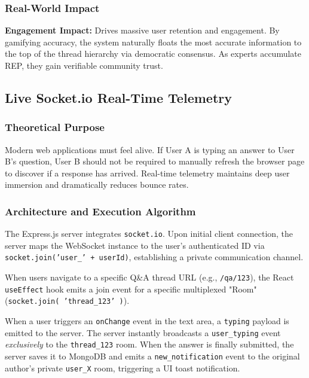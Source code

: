 \documentclass[12pt,a4paper]{article}
\begin{document}
\subsubsection{Real-World Impact}
\textbf{Engagement Impact:} Drives massive user retention and engagement. By gamifying accuracy, the system naturally floats the most accurate information to the top of the thread hierarchy via democratic consensus. As experts accumulate REP, they gain verifiable community trust.

\newpage

\subsection{Live Socket.io Real-Time Telemetry}

\subsubsection{Theoretical Purpose}
Modern web applications must feel alive. If User A is typing an answer to User B's question, User B should not be required to manually refresh the browser page to discover if a response has arrived. Real-time telemetry maintains deep user immersion and dramatically reduces bounce rates.

\subsubsection{Architecture and Execution Algorithm}
The Express.js server integrates \texttt{socket.io}. Upon initial client connection, the server maps the WebSocket instance to the user's authenticated ID via \texttt{socket.join('user\_' + userId)}, establishing a private communication channel.

When users navigate to a specific Q\&A thread URL (e.g., \texttt{/qa/123}), the React \texttt{useEffect} hook emits a join event for a specific multiplexed "Room" (\texttt{socket.join( 'thread\_123' )}). 

When a user triggers an \texttt{onChange} event in the text area, a \texttt{typing} payload is emitted to the server. The server instantly broadcasts a \texttt{user\_typing} event \textit{exclusively} to the \texttt{thread\_123} room. When the answer is finally submitted, the server saves it to MongoDB and emits a \texttt{new\_notification} event to the original author's private \texttt{user\_X} room, triggering a UI toast notification.
\end{document}
